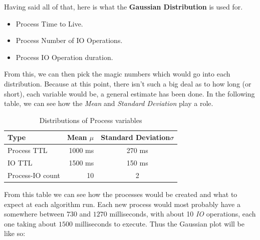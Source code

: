 \documentclass{article}
\newcommand{\code}[1]{\codeinline{\texttt{#1}}}
\begin{document}
Having said all of that, here is what the \textbf{Gaussian Distribution} is used for.

\begin{itemize}
\item Process Time to Live.
\item Process Number of IO Operations.
\item Process IO Operation duration.
\end{itemize}

From this, we can then pick the magic numbers which would go into each distribution. Because at this point, there isn't such a big deal as to how long (or short), each variable would be, a general estimate has been done. In the following table, we can see how the \textit{Mean} and \textit{Standard Deviation} play a role.

\begin{table}[H]
  \begin{center}
    \label{tab:Distributions of Process variables}
    \begin{tabular}{l|r|c}
      \toprule
       \textbf{Type} & \textbf{Mean $\mu$} & \textbf{Standard Deviation$\sigma$} \\
      \midrule
      Process TTL & 1000 ms & 270 ms \\
      IO TTL & 1500 ms & 150 ms \\
      Process-IO count & 10 & 2 \\
      \bottomrule
    \end{tabular}
    \caption{Distributions of Process variables}
  \end{center}
\end{table}

From this table we can see how the processes would be created and what to expect at each algorithm run. Each new process would most probably have a \code{time\_to\_live} somewhere between $730$ and $1270$ milliseconds, with about 10 \textit{IO} operations, each one taking about $1500$ milliseconds to execute. Thus the Gaussian plot will be like so:

\end{document}
